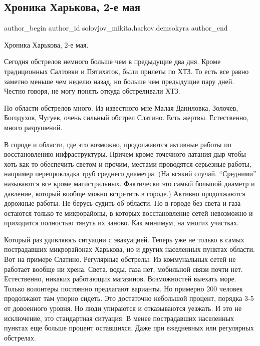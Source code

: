  
 
 
 
 

 
\subsection{Хроника Харькова, 2-е мая}
\label{sec:02_05_2022.fb.solovjov_mikita.harkov.demsokyra.1.hronika}
 
\ifcmt
 author_begin
   author_id solovjov_mikita.harkov.demsokyra
 author_end
\fi

Хроника Харькова, 2-е мая. 

Сегодня обстрелов немного больше чем в предыдущие два дня. Кроме традиционных
Салтовки и Пятихаток, были прилеты по ХТЗ. То есть все равно заметно меньше чем
неделю назад, но больше чем предыдущие пару дней. Честно говоря, не могу понять
откуда обстреливали ХТЗ.

По области обстрелов много. Из известного мне Малая Даниловка, Золочев,
Богодухов, Чугуев, очень сильный обстрел Слатино. Есть жертвы. Естественно,
много разрушений.

В городе и области, где это возможно, продолжаются активные работы по
восстановлению инфраструктуры. Причем кроме точечного латания дыр чтобы хоть
как-то обеспечить светом и прочим, местами проводятся серьезные работы,
например перепрокладка труб среднего диаметра. (На всякий случай. \enquote{Средними}
называются все кроме магистральных. Фактически это самый большой диаметр и
давление, который вообще можно встретить в городе.) Активно продолжаются
дорожные работы. Не берусь судить об области. Но в городе без света и газа
остаются только те микрорайоны, в которых восстановление сетей невозможно и
приходится полностью тянуть их заново. Как минимум, на многих участках.

Который раз удивляюсь ситуации с эвакуацией. Теперь уже не только в самых
пострадавших микрорайонах Харькова, но и других населенных пунктах области. Вот
на примере Слатино. Регулярные обстрелы. Из коммунальных сетей не работает
вообще ни хрена. Света, воды, газа нет, мобильной связи почти нет. Естественно,
никаких работающих магазинов. Возможностей выехать море. Только волонтеры
постоянно предлагают варианты. Но примерно 200 человек продолжают там упорно
сидеть. Это достаточно небольшой процент, порядка 3-5 от довоенного уровня. Но
люди упираются и отказываются уезжать. И это не исключение, это стандартная
ситуация. В менее пострадавших населенных пунктах еще больше процент
оставшихся. Даже при ежедневных или регулярных обстрелах.

